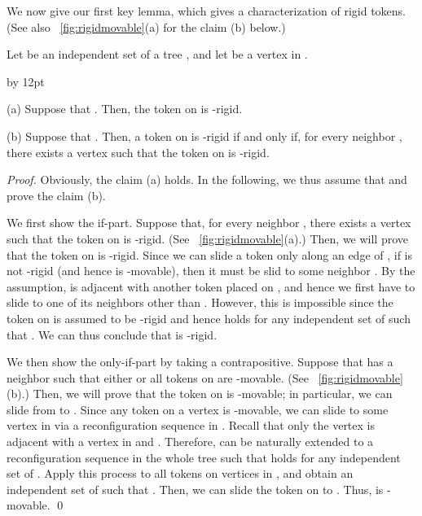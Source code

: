 \documentclass{llncs}
\newenvironment{listing}[1]{\begin{list}{*}{\settowidth{\labelwidth}{#1}\setlength{\leftmargin}{\labelwidth}\advance \leftmargin by 12pt
\setlength{\itemsep}{0pt}\setlength{\parsep}{0pt}\setlength{\topsep}{0pt}\setlength{\parskip}{0pt}}}{\end{list}}
\newcounter{one}
\begin{document}
	We now give our first key lemma, which gives a characterization of rigid tokens. 
(See also \figurename~\ref{fig:rigidmovable}(a) for the claim (b) below.)
	\begin{lemma} \label{lem:rigid}
	Let  be an independent set of a tree , and let  be a vertex in .
	\begin{listing}{aaa}
	\item[{\rm (}a{\rm )}] Suppose that . Then, the token on  is -rigid.
	\item[{\rm (}b{\rm )}] Suppose that . 
					Then, a token on  is -rigid if and only if, 
					for every neighbor , there exists a vertex 
					such that the token on  is -rigid.
	\end{listing}
	\end{lemma}
	\begin{proof}
	Obviously, the claim (a) holds.
	In the following, we thus assume that  and prove the claim (b).

	We first show the if-part.
	Suppose that, for every neighbor , there exists a vertex  such that the token on  is -rigid.
(See \figurename~\ref{fig:rigidmovable}(a).)
	Then, we will prove that the token  on  is -rigid. 
	Since we can slide a token only along an edge of , if  is not -rigid (and hence is -movable), then it must be slid to some neighbor .
	By the assumption,  is adjacent with another token  placed on , and hence we first have to slide  to one of its neighbors other than .
	However, this is impossible since the token  on  is assumed to be -rigid and hence  holds for any independent set  of  such that . 
	We can thus conclude that  is -rigid. 

	We then show the only-if-part by taking a contrapositive. 
	Suppose that  has a neighbor  such that either  or all tokens on  are -movable.
(See \figurename~\ref{fig:rigidmovable}(b).)
	Then, we will prove that the token  on  is -movable;
in particular, we can slide  from  to . 
	Since any token  on a vertex  is -movable, we can slide  to some vertex in  via a reconfiguration sequence  in . 
	Recall that only the vertex  is adjacent with a vertex in  and .
	Therefore,  can be naturally extended to a reconfiguration sequence  in the whole tree  such that  holds for any independent set  of . 
	Apply this process to all tokens on vertices in , and obtain an independent set  of  such that .
	Then, we can slide the token  on  to . 
	Thus,  is -movable. 
\qed
\end{proof}
\end{document}
